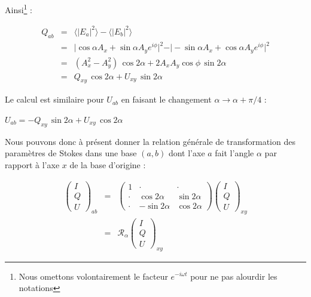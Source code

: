 \documentclass[a4paper,10pt]{article}
\begin{document}
Ainsi\footnote{Nous omettons volontairement le facteur
$e^{-i\omega t}$ pour ne pas alourdir les notations} :

\begin{eqnarray}
Q_{ab} & = & \langle |E_a|^2\rangle - \langle |E_b|^2\rangle
\nonumber
\\ & = & \vert \cos\alpha A_x + \sin\alpha A_ye^{i\phi}\vert^2 -
\vert-\sin\alpha A_x + \cos\alpha A_ye^{i\phi}\vert^2 \nonumber \\
& = & (A_x^2 - A_y^2)\, \cos2\alpha + 2A_xA_y\cos\phi \,
\sin2\alpha \nonumber \\ & = & Q_{xy}\, \cos2\alpha + U_{xy}\,
\sin2\alpha \nonumber
\end{eqnarray}

Le calcul est similaire pour $U_{ab}$ en faisant le changement
$\alpha \rightarrow \alpha + \pi/4$ :

\begin{center}
\begin{math}
U_{ab} = -Q_{xy}\, \sin2\alpha + U_{xy}\, \cos2\alpha
\end{math}
\end{center}

Nous pouvons donc \`a pr\'esent donner la relation g\'en\'erale de
transformation des param\`etres de Stokes dans une base $(a, b)$
dont l'axe $a$ fait l'angle $\alpha$ par rapport \`a l'axe $x$ de
la base d'origine :

\begin{eqnarray}
\left(\begin{array}{c}
I \\
Q \\
U \end{array}\right)_{ab} & = & \left(\begin{array}{crc}
1 & \cdot & \cdot \\
\cdot & \cos2\alpha & \sin2\alpha \\
\cdot & -\sin2\alpha & \cos2\alpha
\end{array}\right)
\left(\begin{array}{c}
I \\
Q \\
U \end{array}\right)_{xy} \label{eq:rot_basis}\\
& = & \mathcal{R}_{\alpha}\left(\begin{array}{c}
I \\
Q \\
U \end{array}\right)_{xy} \label{eq:rot_stokes}
\end{eqnarray}
\end{document}

